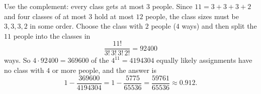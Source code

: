 Use the complement: every class gets at most $3$ people. Since $11=3+3+3+2$ and four classes of at most $3$ hold at most $12$ people, the class sizes must be $3,3,3,2$ in some order. Choose the class with $2$ people ($4$ ways) and then split the $11$ people into the classes in
\[\dfrac{11!}{3!\,3!\,3!\,2!}=92400\]
ways. So $4\cdot92400=369600$ of the $4^{11}=4194304$ equally likely assignments have no class with $4$ or more people, and the answer is
\[1-\dfrac{369600}{4194304}=1-\dfrac{5775}{65536}=\boxed{\dfrac{59761}{65536}}\approx0.912.\]
